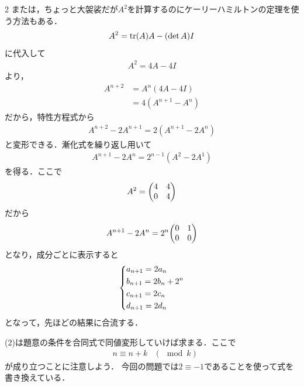\documentclass[../../main.tex]{subfiles}
\begin{document}
\begin{multicols}{2}
  または，ちょっと大袈裟だが$A^2$を計算するのにケーリーハミルトンの定理を使う方法もある．
  \begin{align}
    A^2 = \tr(A)A - (\det A)I
  \end{align}
  に代入して
  \begin{align}
    A^2 = 4 A - 4I
  \end{align}
  より，
  \begin{align}
    A^{n+2}
    & = A^{n} \left(4A-4I\right)       \\
    & = 4 \left(A^{n+1} - A^{n}\right)
  \end{align}
  だから，特性方程式から
  \begin{align}
    A^{n+2} - 2 A^{n+1} = 2\left(A^{n+1}-2 A^{n}\right)
  \end{align}
  と変形できる．漸化式を繰り返し用いて
  \begin{align}
    A^{n+1} - 2 A^{n} = 2^{n-1} \left(A^{2}- 2 A^{1}\right)
  \end{align}
  を得る．ここで
  \begin{align}
    A^{2} = \mqty(4 & 4 \\ 0 & 4)
  \end{align}
  だから
  \begin{align}
    A^{n+1} - 2 A^{n} = 2^{n} \mqty(0 & 1 \\ 0 & 0)
  \end{align}
  となり，成分ごとに表示すると
  \begin{align}
    \begin{dcases}
      a_{n+1} = 2 a_{n}         \\
      b_{n+1} = 2 b_{n} + 2^{n} \\
      c_{n+1} = 2 c_{n}         \\
      d_{n+1} = 2 d_{n}
    \end{dcases}
  \end{align}
  となって，先ほどの結果に合流する．

  (2)は題意の条件を合同式で同値変形していけば求まる．ここで
  \begin{align}
    & n \equiv n+k & (\mod k)
  \end{align}
  が成り立つことに注意しよう．
  今回の問題では$2 \equiv -1$であることを使って式を書き換えている．

  \newpage
\end{multicols}
\end{document}
